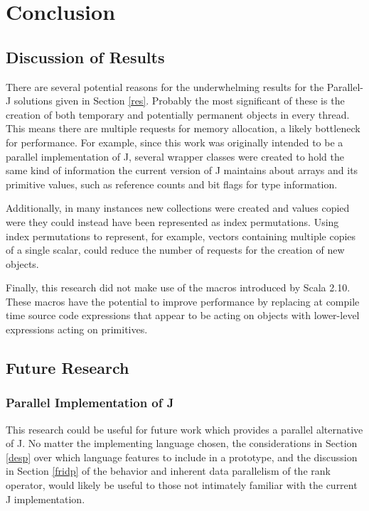 \chapter{Conclusion}
\label{conc}

\section{Discussion of Results}
There are several potential reasons for the underwhelming results for the Parallel-J solutions given in Section \ref{res}. 
Probably the most significant of these is the creation of both temporary 
and potentially permanent objects in every thread. 
This means there are multiple requests for memory allocation, a likely bottleneck for performance.
For example, since this work was originally intended to be a parallel implementation of J, 
several wrapper classes were created to hold the same kind of information the current version of J \cite{ioj} 
maintains about arrays and its primitive values, such as reference counts and bit flags for type information. 

Additionally, in many instances new collections were created and values copied 
were they could instead have been represented as index permutations. %
Using index permutations to represent, for example, vectors containing multiple copies of a single scalar, 
could reduce the number of requests for the creation of new objects.

Finally, this research did not make use of the macros introduced by Scala 2.10. %
These macros have the potential to improve performance 
by replacing at compile time source code expressions that appear to be acting on objects 
with lower-level expressions acting on primitives.

\section{Future Research}
\subsection{Parallel Implementation of J}
This research could be useful for future work which provides 
a parallel alternative of J.
No matter the implementing language chosen, 
the considerations in Section \ref{desp} 
over which language features to include in a prototype, 
and the discussion in Section \ref{fridp} of the behavior and inherent data parallelism of the rank operator, 
would likely be useful to those not intimately familiar with the current J implementation.

